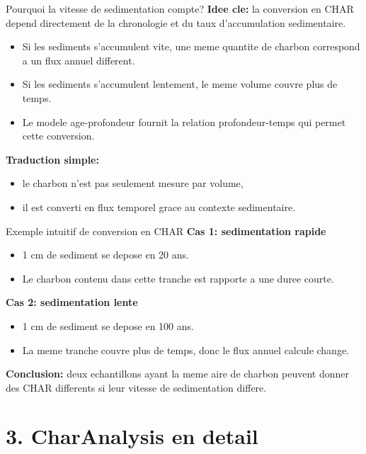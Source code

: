\documentclass[aspectratio=169,11pt]{beamer}
\begin{document}
\begin{frame}{Pourquoi la vitesse de sedimentation compte?}
\textbf{Idee cle:} la conversion en CHAR depend directement de la chronologie et du taux d'accumulation sedimentaire.

\vspace{0.2cm}
\begin{itemize}
  \item Si les sediments s'accumulent vite, une meme quantite de charbon correspond a un flux annuel different.
  \item Si les sediments s'accumulent lentement, le meme volume couvre plus de temps.
  \item Le modele age-profondeur fournit la relation profondeur-temps qui permet cette conversion.
\end{itemize}

\vspace{0.2cm}
\textbf{Traduction simple:}
\begin{itemize}
  \item le charbon n'est pas seulement mesure par volume,
  \item il est converti en flux temporel grace au contexte sedimentaire.
\end{itemize}
\end{frame}

\begin{frame}{Exemple intuitif de conversion en CHAR}
\textbf{Cas 1: sedimentation rapide}
\begin{itemize}
  \item 1 cm de sediment se depose en 20 ans.
  \item Le charbon contenu dans cette tranche est rapporte a une duree courte.
\end{itemize}

\textbf{Cas 2: sedimentation lente}
\begin{itemize}
  \item 1 cm de sediment se depose en 100 ans.
  \item La meme tranche couvre plus de temps, donc le flux annuel calcule change.
\end{itemize}

\vspace{0.2cm}
\textbf{Conclusion:} deux echantillons ayant la meme aire de charbon peuvent donner des CHAR differents si leur vitesse de sedimentation differe.
\end{frame}

\section{3. CharAnalysis en detail}
\end{document}
